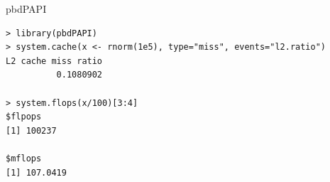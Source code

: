 \begin{frame}[fragile]
\begin{block}{pbdPAPI}
\begin{minipage}[t]{.2\textwidth}
  \end{minipage}
\begin{lstlisting}
> library(pbdPAPI)
> system.cache(x <- rnorm(1e5), type="miss", events="l2.ratio")
L2 cache miss ratio 
          0.1080902 

> system.flops(x/100)[3:4]
$flpops
[1] 100237

$mflops
[1] 107.0419
\end{lstlisting}
  \end{block}
\end{frame}





